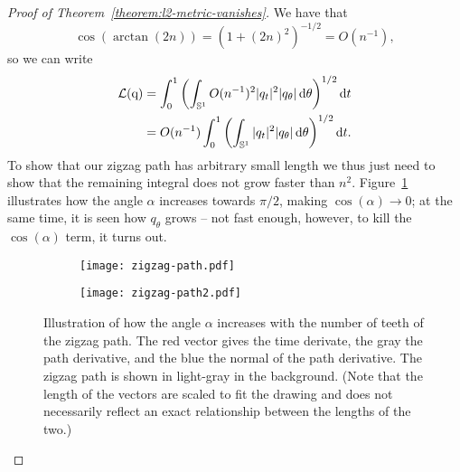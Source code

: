 \begin{proof}[Proof of Theorem~\ref{theorem:l2-metric-vanishes}]
  We have that
  \begin{equation*}
    \cos(\arctan(2n)) = (1+(2n)^2)^{-1/2}
    = O(n^{-1}),
  \end{equation*}
  so we can write
  \begin{equation}
    \label{eq:approx-L-angle}
    \begin{aligned}
    \mathcal{L}( \mathrm{q} )
    & =
      \int_{0}^{1}
      \left(
      \int_{\mathbb{S}^{1}}
      O(n^{-1})^2
      | q _t|^2   | q _{\theta}|
      \mathop{}\!\mathrm{d} \theta
      \right)^{1/2} \mathop{}\!\mathrm{d} t \\
    & =
      O(n^{-1})
      \int_{0}^{1}
      \left(
      \int_{\mathbb{S}^{1}}
      | q _t|^2   | q _{\theta}|
      \mathop{}\!\mathrm{d} \theta
      \right)^{1/2} \mathop{}\!\mathrm{d} t.
    \end{aligned}
  \end{equation}
  To show that our zigzag path has arbitrary small length we thus just need to show that the remaining integral does not grow faster than $n^{2}$. Figure~\ref{fig:zigzag-path-angle} illustrates how the angle $\alpha$ increases towards $\pi/2$, making $\cos(\alpha) \rightarrow 0$; at the same time, it is seen how $q_{\theta}$ grows -- not fast enough, however, to kill the $\cos(\alpha)$ term, it turns out.

\begin{figure}
  \centering
  \begin{subfigure}{.49\textwidth}
    \centering
    \texttt{[image: zigzag-path.pdf]}
  \end{subfigure}
  \begin{subfigure}{.49\textwidth}
    \centering
    \texttt{[image: zigzag-path2.pdf]}
  \end{subfigure}
  \caption{Illustration of how the angle $\alpha$ increases with the number of teeth of the zigzag path. The red vector gives the time derivate, the gray the path derivative, and the blue the normal of the path derivative. The zigzag path is shown in light-gray in the background. (Note that the length of the vectors are scaled to fit the drawing and does not necessarily reflect an exact relationship between the lengths of the two.)}
  \label{fig:zigzag-path-angle}
\end{figure}


\end{proof}
